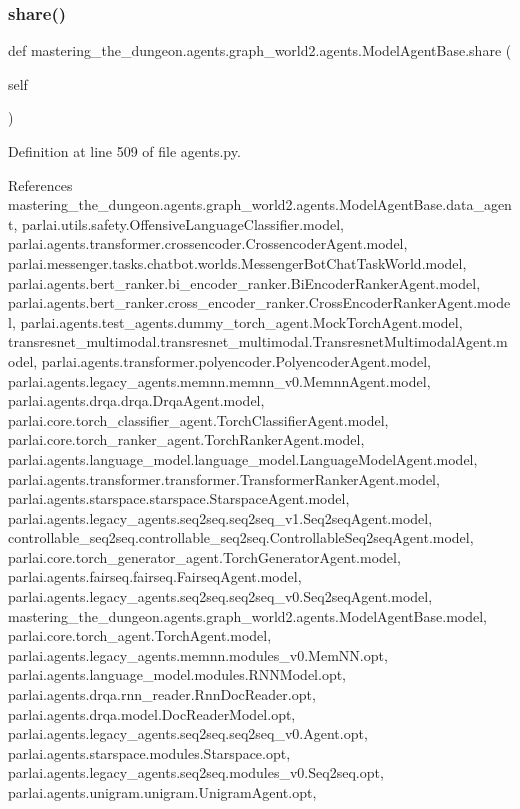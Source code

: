 \subsubsection{\texorpdfstring{share()}{share()}}
{\footnotesize\ttfamily def mastering\+\_\+the\+\_\+dungeon.\+agents.\+graph\+\_\+world2.\+agents.\+Model\+Agent\+Base.\+share (\begin{DoxyParamCaption}\item[{}]{self }\end{DoxyParamCaption})}



Definition at line 509 of file agents.\+py.



References mastering\+\_\+the\+\_\+dungeon.\+agents.\+graph\+\_\+world2.\+agents.\+Model\+Agent\+Base.\+data\+\_\+agent, parlai.\+utils.\+safety.\+Offensive\+Language\+Classifier.\+model, parlai.\+agents.\+transformer.\+crossencoder.\+Crossencoder\+Agent.\+model, parlai.\+messenger.\+tasks.\+chatbot.\+worlds.\+Messenger\+Bot\+Chat\+Task\+World.\+model, parlai.\+agents.\+bert\+\_\+ranker.\+bi\+\_\+encoder\+\_\+ranker.\+Bi\+Encoder\+Ranker\+Agent.\+model, parlai.\+agents.\+bert\+\_\+ranker.\+cross\+\_\+encoder\+\_\+ranker.\+Cross\+Encoder\+Ranker\+Agent.\+model, parlai.\+agents.\+test\+\_\+agents.\+dummy\+\_\+torch\+\_\+agent.\+Mock\+Torch\+Agent.\+model, transresnet\+\_\+multimodal.\+transresnet\+\_\+multimodal.\+Transresnet\+Multimodal\+Agent.\+model, parlai.\+agents.\+transformer.\+polyencoder.\+Polyencoder\+Agent.\+model, parlai.\+agents.\+legacy\+\_\+agents.\+memnn.\+memnn\+\_\+v0.\+Memnn\+Agent.\+model, parlai.\+agents.\+drqa.\+drqa.\+Drqa\+Agent.\+model, parlai.\+core.\+torch\+\_\+classifier\+\_\+agent.\+Torch\+Classifier\+Agent.\+model, parlai.\+core.\+torch\+\_\+ranker\+\_\+agent.\+Torch\+Ranker\+Agent.\+model, parlai.\+agents.\+language\+\_\+model.\+language\+\_\+model.\+Language\+Model\+Agent.\+model, parlai.\+agents.\+transformer.\+transformer.\+Transformer\+Ranker\+Agent.\+model, parlai.\+agents.\+starspace.\+starspace.\+Starspace\+Agent.\+model, parlai.\+agents.\+legacy\+\_\+agents.\+seq2seq.\+seq2seq\+\_\+v1.\+Seq2seq\+Agent.\+model, controllable\+\_\+seq2seq.\+controllable\+\_\+seq2seq.\+Controllable\+Seq2seq\+Agent.\+model, parlai.\+core.\+torch\+\_\+generator\+\_\+agent.\+Torch\+Generator\+Agent.\+model, parlai.\+agents.\+fairseq.\+fairseq.\+Fairseq\+Agent.\+model, parlai.\+agents.\+legacy\+\_\+agents.\+seq2seq.\+seq2seq\+\_\+v0.\+Seq2seq\+Agent.\+model, mastering\+\_\+the\+\_\+dungeon.\+agents.\+graph\+\_\+world2.\+agents.\+Model\+Agent\+Base.\+model, parlai.\+core.\+torch\+\_\+agent.\+Torch\+Agent.\+model, parlai.\+agents.\+legacy\+\_\+agents.\+memnn.\+modules\+\_\+v0.\+Mem\+N\+N.\+opt, parlai.\+agents.\+language\+\_\+model.\+modules.\+R\+N\+N\+Model.\+opt, parlai.\+agents.\+drqa.\+rnn\+\_\+reader.\+Rnn\+Doc\+Reader.\+opt, parlai.\+agents.\+drqa.\+model.\+Doc\+Reader\+Model.\+opt, parlai.\+agents.\+legacy\+\_\+agents.\+seq2seq.\+seq2seq\+\_\+v0.\+Agent.\+opt, parlai.\+agents.\+starspace.\+modules.\+Starspace.\+opt, parlai.\+agents.\+legacy\+\_\+agents.\+seq2seq.\+modules\+\_\+v0.\+Seq2seq.\+opt, parlai.\+agents.\+unigram.\+unigram.\+Unigram\+Agent.\+opt, 